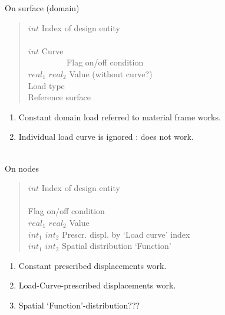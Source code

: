 On surface (domain)
\begin{quote}
 $int$ \cnl \chs Index of design entity\\
\cod{-} \cnl\\
\cgb {} \cor $int$ \cge \chs Curve\\
\cgb\  \cor\  \cge\ \cgb\  \cor\  \cge\  \cnl \chs Flag on/off condition \\
$real_1$ $real_2$  \cnl \chs Value (without curve?)\\
 \cnl \chs Load type\\
 \chs Reference surface
\end{quote}
\begin{enumerate}
\item Constant domain load referred to material frame works.
\item Individual load curve is ignored : does not work.
\end{enumerate}


\\
On nodes
\begin{quote}
 $int$ \cnl \chs Index of design entity\\
\cod{-} \cnl \\
\cgb {} \cor {} \cge \cgb {} \cor {} \cge {} \cnl \chs Flag on/off condition \\
$real_1$ $real_2$  \cnl \chs Value\\
\cgb {} \cor $int_1$ \cge
\cgb {} \cor $int_2$ \cge
{} \cnl
\chs Prescr. displ. by `Load curve' index\\
$int_1$ $int_2$  \chs Spatial distribution `Function'
\end{quote}
\begin{enumerate}
\item Constant prescribed displacements work.
\item Load-Curve-prescribed displacements work.
\item Spatial `Function'-distribution???
\end{enumerate}

